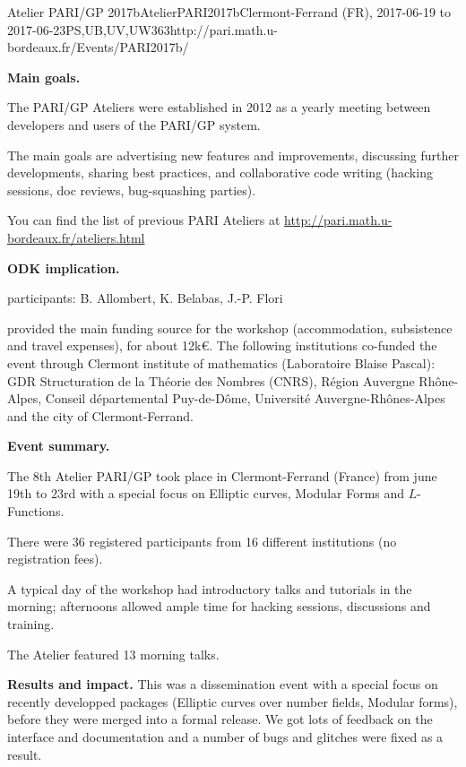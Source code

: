 \begin{event}{Atelier PARI/GP 2017b}{AtelierPARI2017b}{Clermont-Ferrand (FR),
2017-06-19 to 2017-06-23}{PS,UB,UV,UW}{36}{3}{http://pari.math.u-bordeaux.fr/Events/PARI2017b/}

\textbf{Main goals.}

The PARI/GP Ateliers were established in 2012 as a yearly meeting
between developers and users of the PARI/GP system.

The main goals are advertising new features and improvements,
discussing further developments, sharing best practices, and collaborative
code writing (hacking sessions, doc reviews, bug-squashing parties).

You can find the list of previous PARI Ateliers at
\url{http://pari.math.u-bordeaux.fr/ateliers.html}

\textbf{ODK implication.} 

\ODK participants: B. Allombert, K. Belabas, J.-P. Flori

\ODK provided the main funding source for the workshop (accommodation,
subsistence and travel expenses), for about 12k\euro. The following
institutions co-funded the event through Clermont institute of mathematics
  (Laboratoire
  Blaise Pascal): GDR Structuration de la Théorie des Nombres (CNRS), Région
  Auvergne Rhône-Alpes, Conseil départemental Puy-de-Dôme, Université
  Auvergne-Rhônes-Alpes and the city of Clermont-Ferrand.

\textbf{Event summary.} 

The 8th Atelier PARI/GP took place in Clermont-Ferrand (France) from june
19th to 23rd with a special focus on Elliptic curves, Modular Forms and
$L$-Functions.

There were 36 registered participants from 16 different institutions
(no registration fees).

A typical day of the workshop had introductory talks and tutorials
in the morning; afternoons allowed ample time for hacking sessions,
discussions and training.

The Atelier featured 13 morning talks.

\textbf{Results and impact.} 
This was a dissemination event with a special focus on recently developped
packages (Elliptic curves over number fields, Modular forms), before they were
merged into a formal release. We got lots of feedback on the interface and
documentation and a number of bugs and glitches were fixed as a result.
\end{event}
